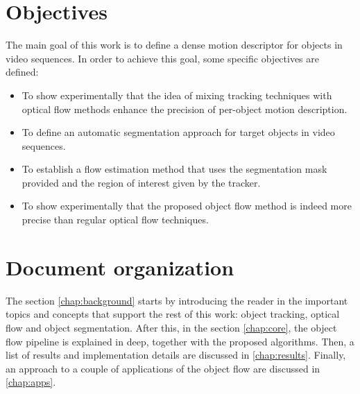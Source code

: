\section{Objectives}

The main goal of this work is to define a dense motion descriptor for objects in video sequences. 
In order to achieve this goal, some specific objectives are defined:

\begin{itemize}

  \item To show experimentally that the idea of mixing tracking techniques with optical flow methods enhance the precision of per-object motion description.
  \item To define an automatic segmentation approach for target objects in video sequences.
  \item To establish a flow estimation method that uses the segmentation mask provided and the region of interest given by the tracker.
  \item To show experimentally that the proposed object flow method is indeed more precise than regular optical flow techniques.

\end{itemize}

\section{Document organization}

The section \ref{chap:background} starts by introducing the reader in the important topics and concepts that support the rest of this work: 
object tracking, optical flow and object segmentation. After this, in the section \ref{chap:core}, the object flow pipeline is explained in deep, 
together with the proposed algorithms. Then, a list of results and implementation details are discussed in \ref{chap:results}. Finally, 
an approach to a couple of applications of the object flow are discussed in 
\ref{chap:apps}.


